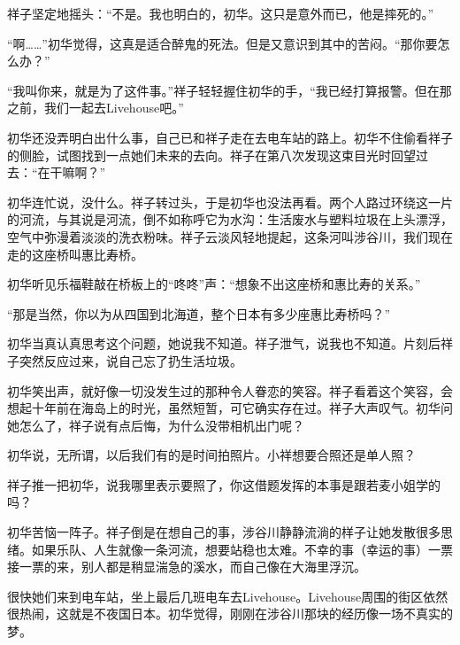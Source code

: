 \documentclass{article}
\begin{document}
祥子坚定地摇头：“不是。我也明白的，初华。这只是意外而已，他是摔死的。”



“啊……”初华觉得，这真是适合醉鬼的死法。但是又意识到其中的苦闷。“那你要怎么办？”



“我叫你来，就是为了这件事。”祥子轻轻握住初华的手，“我已经打算报警。但在那之前，我们一起去Livehouse吧。”



初华还没弄明白出什么事，自己已和祥子走在去电车站的路上。初华不住偷看祥子的侧脸，试图找到一点她们未来的去向。祥子在第八次发现这束目光时回望过去：“在干嘛啊？”



初华连忙说，没什么。祥子转过头，于是初华也没法再看。两个人路过环绕这一片的河流，与其说是河流，倒不如称呼它为水沟：生活废水与塑料垃圾在上头漂浮，空气中弥漫着淡淡的洗衣粉味。祥子云淡风轻地提起，这条河叫涉谷川，我们现在走的这座桥叫惠比寿桥。



初华听见乐福鞋敲在桥板上的“咚咚”声：“想象不出这座桥和惠比寿的关系。”



“那是当然，你以为从四国到北海道，整个日本有多少座惠比寿桥吗？”



初华当真认真思考这个问题，她说我不知道。祥子泄气，说我也不知道。片刻后祥子突然反应过来，说自己忘了扔生活垃圾。



初华笑出声，就好像一切没发生过的那种令人眷恋的笑容。祥子看着这个笑容，会想起十年前在海岛上的时光，虽然短暂，可它确实存在过。祥子大声叹气。初华问她怎么了，祥子说有点后悔，为什么没带相机出门呢？



初华说，无所谓，以后我们有的是时间拍照片。小祥想要合照还是单人照？



祥子推一把初华，说我哪里表示要照了，你这借题发挥的本事是跟若麦小姐学的吗？



初华苦恼一阵子。祥子倒是在想自己的事，涉谷川静静流淌的样子让她发散很多思绪。如果乐队、人生就像一条河流，想要站稳也太难。不幸的事（幸运的事）一票接一票的来，别人都是稍显湍急的溪水，而自己像在大海里浮沉。



很快她们来到电车站，坐上最后几班电车去Livehouse。Livehouse周围的街区依然很热闹，这就是不夜国日本。初华觉得，刚刚在涉谷川那块的经历像一场不真实的梦。
\end{document}
